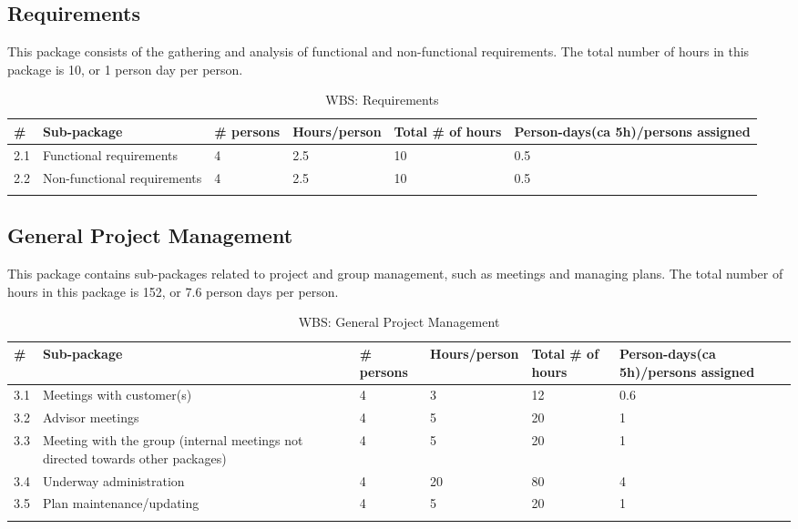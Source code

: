 \newpage
\subsection{Requirements}
This package consists of the gathering and analysis of functional and non-functional requirements. The total number of hours in this package is 10, or 1 person day per person.
\begin{longtable}{|p{0.7cm}|p{3cm}|p{1.8cm}|p{2.5cm}|p{2cm}|p{2.8cm}|}
\hline
\# & Sub-package & \# persons & Hours/person & Total \# of hours & Person-days(ca 5h)/persons assigned\\ 
\hline
2.1 & Functional requirements & 4 & 2.5 & 10 & 0.5\\ 
\hline
2.2 & Non-functional requirements & 4 & 2.5 & 10 & 0.5\\ 
\hline

\caption{WBS: Requirements}
\end{longtable}

\subsection{General Project Management}
This package contains sub-packages related to project and group management, such as meetings and managing plans. The total number of hours in this package is 152, or 7.6 person days per person.
\begin{longtable}{|p{0.7cm}|p{3cm}|p{1.8cm}|p{2.5cm}|p{2cm}|p{2.8cm}|}
\hline
\# & Sub-package & \# persons & Hours/person & Total \# of hours & Person-days(ca 5h)/persons assigned\\ 
\hline
3.1 & Meetings with customer(s)  & 4 & 3 & 12 & 0.6\\ 
\hline
3.2 & Advisor meetings  & 4 & 5 & 20 & 1\\ 
\hline
3.3 & Meeting with the group (internal meetings not directed towards other packages) & 4 & 5 & 20 & 1\\ 
\hline
3.4 & Underway administration & 4 & 20 & 80 & 4\\ 
\hline
3.5 & Plan maintenance/updating & 4 & 5 & 20 & 1\\ 
\hline

\caption{WBS: General Project Management}
\end{longtable}

